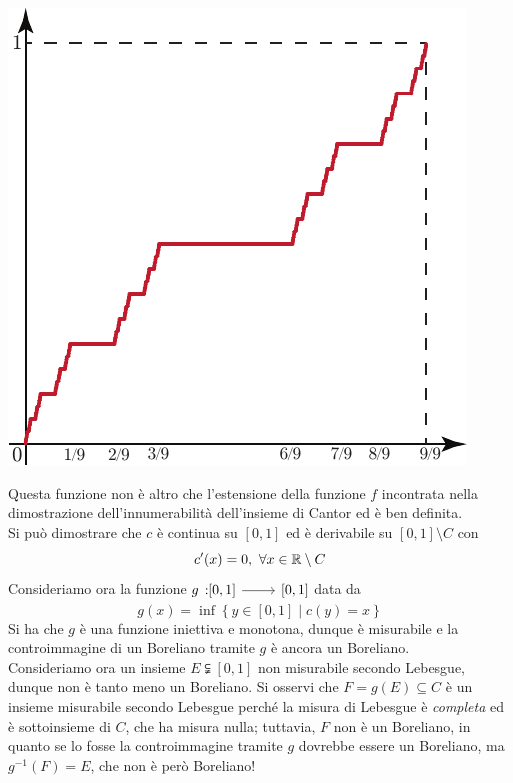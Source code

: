 \begin{center}
	\includegraphics[width=0.4\paperwidth]{images/vasingolarecontinua}
\end{center}
Questa funzione non è altro che l'estensione della funzione $f$ incontrata nella dimostrazione dell'innumerabilità dell'insieme di Cantor ed è ben definita.\\
Si può dimostrare che $c$ è continua su $\left[0,1\right]$ ed è derivabile su $\left[0,1\right]\setminus C$ con
\begin{equation*}
	c'(x)=0,\ \forall x\in\mathbb{R}\setminus C
\end{equation*}
Consideriamo ora la funzione $\funz{g}{\left[0,1\right]}{\left[0,1\right]}$ data da
\begin{equation}
	g(x)=\inf\left\{y\in\left[0,1\right]\mid c(y)=x\right\}
\end{equation}
Si ha che $g$ è una funzione iniettiva e monotona, dunque è misurabile e la controimmagine di un Boreliano tramite $g$ è ancora un Boreliano.\\
Consideriamo ora un insieme $E\subsetneqq \left[0,1\right]$ non misurabile secondo Lebesgue, dunque non è tanto meno un Boreliano. Si osservi che $F=g(E)\subseteq C$ è un insieme misurabile secondo Lebesgue perché la misura di Lebesgue è \textit{completa} ed è sottoinsieme di $C$, che ha misura nulla; tuttavia, $F$ non è un Boreliano, in quanto se lo fosse la controimmagine tramite $g$ dovrebbe essere un Boreliano, ma $g^{-1}(F)=E$, che non è però Boreliano!